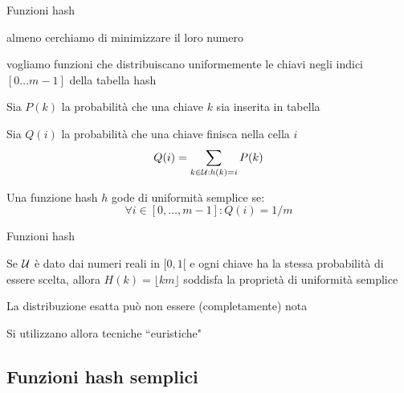 \begin{frame}{Funzioni hash}

\vspace{-9pt}
\begin{myboxtitle}
\BI
\item almeno cerchiamo di minimizzare il loro numero
\item vogliamo funzioni che distribuiscano \alert{uniformemente} le chiavi negli 
  indici $[0 \ldots m-1]$ della tabella hash
\EI
\end{myboxtitle}

\begin{myboxtitle}
\BI
\item Sia $P(k)$ la probabilità che una chiave $k$ sia inserita in tabella
\item Sia $Q(i)$ la probabilità che una chiave finisca nella cella $i$
\[
  Q(i) = \sum_{k \in {\cal U}: h(k)=i} P(k)
\]
\item Una funzione hash $h$ gode di \alert{uniformità semplice} se:
\[
  \forall i \in [0, \ldots, m-1] : Q(i) = 1/m
\]
\EI
\end{myboxtitle}

\end{frame}


\begin{frame}{Funzioni hash}

\vspace{-9pt}

\begin{myboxtitle}[Esempio]
Se $\cal U$ è dato dai numeri reali in $[0,1[$  e ogni chiave ha la stessa probabilità di essere scelta, allora 
$H(k) = \lfloor km \rfloor$ soddisfa la proprietà di uniformità semplice
\end{myboxtitle}


\BIL
\item La distribuzione esatta può non essere (completamente) nota
\item Si utilizzano allora tecniche ``\alert{euristiche}"
\EIL

\end{frame}

\subsection{Funzioni hash semplici}

